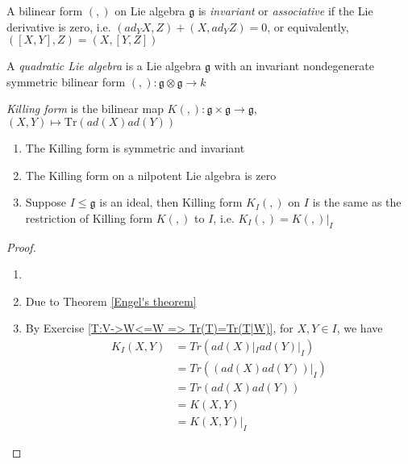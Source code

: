 \documentclass[main]{subfiles}
\begin{document}
\begin{definition}
A bilinear form $(,)$ on Lie algebra $\mathfrak{g}$ is \textit{invariant} or \textit{associative} if the Lie derivative is zero, i.e. $(ad_YX,Z)+(X,ad_YZ)=0$, or equivalently, $([X,Y],Z)=(X,[Y,Z])$
\end{definition}

\begin{definition}
A \textit{quadratic Lie algebra} is a Lie algebra $\mathfrak g$ with an invariant nondegenerate symmetric bilinear form $(,):\mathfrak g\otimes\mathfrak g\to k$
\end{definition}

\begin{definition}
\textit{Killing form} is the bilinear map $K(,):\mathfrak{g}\times\mathfrak{g}\to\mathfrak{g}$, $(X,Y)\mapsto \mathrm{Tr}\left(ad(X)ad(Y)\right)$
\end{definition}

\begin{proposition}\label{Some basic properties of Killing form} \hfill
\begin{enumerate}[leftmargin=*,label=\textit{(\alph*)}]
\item The Killing form is symmetric and invariant
\item The Killing form on a nilpotent Lie algebra is zero
\item Suppose $I\leq\mathfrak{g}$ is an ideal, then Killing form $K_{I}(,)$ on $I$ is the same as the restriction of Killing form $K(,)$ to $I$, i.e. $K_I(,)=K(,)|_I$
\end{enumerate}
\end{proposition}

\begin{proof} \hfill
\begin{enumerate}[leftmargin=*,label=\textit{(\alph*)}]
\item 
\item Due to Theorem \ref{Engel's theorem}
\item By Exercise \ref{T:V->W<=W => Tr(T)=Tr(T|W)}, for $X,Y\in I$, we have
\begin{align*}
K_I(X,Y)&=Tr(ad(X)|_Iad(Y)|_I) \\&=Tr\left((ad(X)ad(Y))|_I\right) \\&=Tr(ad(X)ad(Y)) \\&=K(X,Y)\\&=K(X,Y)|_I
\end{align*}
\end{enumerate}
\end{proof}
\end{document}
